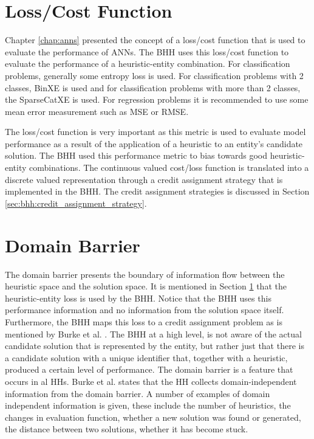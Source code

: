 \section{Loss/Cost Function}
\label{sec:bhh:loss_function}

Chapter \ref{chap:anns} presented the concept of a loss/cost function that is used to evaluate the performance of \acp{ANN}. The \ac{BHH} uses this loss/cost function to evaluate the performance of a heuristic-entity combination. For classification problems, generally some entropy loss is used. For classification problems with 2 classes, \ac{BinXE} is used and for classification problems with more than 2 classes, the \ac{SparseCatXE} is used. For regression problems it is recommended to use some mean error measurement such as \ac{MSE} or \ac{RMSE}.

The loss/cost function is very important as this metric is used to evaluate model performance as a result of the application of a heuristic to an entity's candidate solution. The \ac{BHH} used this performance metric to bias towards good heuristic-entity combinations.  The continuous valued cost/loss function is translated into a discrete valued representation through a credit assignment strategy that is implemented in the \ac{BHH}. The credit assignment strategies is discussed in Section \ref{sec:bhh:credit_assignment_strategy}.

\section{Domain Barrier}
\label{sec:bhh:domain_barrier}

The domain barrier presents the boundary of information flow between the heuristic space and the solution space. It is mentioned in Section \ref{sec:bhh:loss_function} that the heuristic-entity loss is used by the \ac{BHH}. Notice that the \ac{BHH} uses this performance information and no information from the solution space itself. Furthermore, the \ac{BHH} maps this loss to a credit assignment problem as is mentioned by Burke et al. \cite{ref:burke:2010}. The \ac{BHH} at a high level, is not aware of the actual candidate solution that is represented by the entity, but rather just that there is a candidate solution with a unique identifier that, together with a heuristic, produced a certain level of performance. The domain barrier is a feature that occurs in al \acp{HH}.  Burke et al. \cite{ref:burke:2010} states that the \ac{HH} collects domain-independent information from the domain barrier. A number of examples of domain independent information is given, these include the number of heuristics, the changes in evaluation function, whether a new solution was found or generated, the distance between two solutions, whether it has become stuck.


